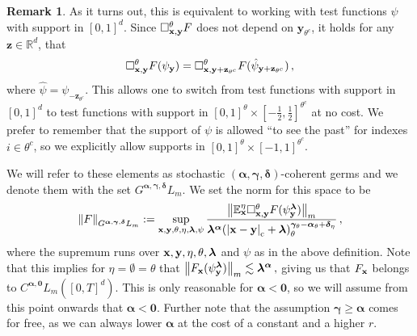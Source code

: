 \documentclass[12pt]{article}
\numberwithin{equation}{section}
\theoremstyle{plain}
\theoremstyle{definition}
\newtheorem{remark}[theorem]{Remark}
\newcommand{\compAbs}[1]{\left\vert#1\right\vert_{\text{c}}}
\newcommand{\norm}[1]{\left\Vert #1\right\Vert}
\def\bR{\mathbb{R}}\def\bS{\mathbb{S}}
\def\bE{\mathbb{E}}\def\bW{\mathbb{W}}
\def\fy{\mathbf y}\def\fz{\mathbf z}
\def\falpha{{\boldsymbol\alpha}}
\def\fgamma{{\boldsymbol\gamma}}
\def\fdelta{{\boldsymbol\delta}}
\def\flambda{{\boldsymbol\lambda}}
\def\foo{{\boldsymbol 0}}
\begin{document}
\begin{remark}
As it turns out, this is equivalent to working with test functions $\psi$ with support in $[0,1]^d$. Since $\square^\theta_{\fx,\fy} F$ does not depend on $\fy_{\theta^c}$, it holds for any $\fz\in\bR^d$, that
\[
\square_{\fx,\fy}^\theta F(\psi_\fy) = \square_{\fx,\fy+\fz_{\theta^c}}^\theta F(\hat\psi_{\fy+\fz_{\theta^c}})\,,
\]
where $\hat\psi = \psi_{-\fz_{\theta^c}}$. This allows one to switch from test functions with support in $[0,1]^d$ to test functions with support in $[0,1]^\theta\times[-\frac 12,\frac 12]^{\theta^c}$ at no cost. We prefer to remember that the support of $\psi$ is allowed ``to see the past'' for indexes $i\in\theta^c$, so we explicitly allow supports in $[0,1]^\theta\times[-1,1]^{\theta^c}$.
\end{remark}

 We will refer to these elements as stochastic $(\falpha,\fgamma,\fdelta)$-coherent germs and we denote them with the set $G^{\falpha,\fgamma,\fdelta}L_m$. We set the norm for this space to be
%
\begin{equation}\label{ineq:coherenceNorm}
    \norm{F}_{G^{\falpha,\fgamma,\fdelta}L_m} := \sup_{\fx,\fy,\theta,\eta,\flambda,\psi}\frac{\norm{\bE^\eta_\fx \square^\theta_{\fx,\fy} F(\psi_\fy^{\flambda})}_m}{\flambda^{\falpha}(\compAbs{\fx-\fy}+\flambda)^{\fgamma_\theta-\falpha_\theta+\fdelta_\eta}_{\theta}}\,,
\end{equation}
%
where the supremum runs over $\fx,\fy,\eta,\theta,\flambda$ and $\psi$ as in the above definition.  Note that this implies for $\eta=\emptyset=\theta$ that    $\norm{F_\fx(\psi_\fy^\flambda)}_m\lesssim \flambda^{\falpha}\,,$
giving us that $F_\mathbf x$ belongs to $C^{\falpha,\foo}L_m([0,T]^d)$. This is only reasonable for $\falpha<\foo$, so we will assume from this point onwards that $\falpha <\foo$. Further note that the assumption $\fgamma\ge\falpha$ comes for free, as we can always lower $\falpha$ at the cost of a constant and a higher $r$.
\end{document}
